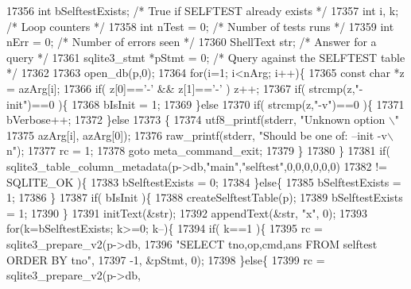 \begin{DoxyCode}
{{{{{{{{{{{{{{{{{{{{{{{{{{{{{{{{{{{{{{{{{{{{{{{{{{{{{{{{{{{{{{{{{{{{{{{{{{{{{{{{{{{{{{{{{{{{{{{{{{{17356     \textcolor{keywordtype}{int} bSelftestExists;     \textcolor{comment}{/* True if SELFTEST already exists */}
17357     \textcolor{keywordtype}{int} i, k;                \textcolor{comment}{/* Loop counters */}
17358     \textcolor{keywordtype}{int} nTest = 0;           \textcolor{comment}{/* Number of tests runs */}
17359     \textcolor{keywordtype}{int} nErr = 0;            \textcolor{comment}{/* Number of errors seen */}
17360     ShellText str;           \textcolor{comment}{/* Answer for a query */}
17361     sqlite3_stmt *pStmt = 0; \textcolor{comment}{/* Query against the SELFTEST table */}
17362 
17363     open_db(p,0);
17364     \textcolor{keywordflow}{for}(i=1; i<nArg; i++)\{
17365       \textcolor{keyword}{const} \textcolor{keywordtype}{char} *z = azArg[i];
17366       \textcolor{keywordflow}{if}( z[0]==\textcolor{charliteral}{'-'} && z[1]==\textcolor{charliteral}{'-'} ) z++;
17367       \textcolor{keywordflow}{if}( strcmp(z,\textcolor{stringliteral}{"-init"})==0 )\{
17368         bIsInit = 1;
17369       \}\textcolor{keywordflow}{else}
17370       \textcolor{keywordflow}{if}( strcmp(z,\textcolor{stringliteral}{"-v"})==0 )\{
17371         bVerbose++;
17372       \}\textcolor{keywordflow}{else}
17373       \{
17374         utf8_printf(stderr, \textcolor{stringliteral}{"Unknown option \(\backslash\)"%
17375                     azArg[i], azArg[0]);
17376         raw_printf(stderr, \textcolor{stringliteral}{"Should be one of: --init -v\(\backslash\)n"});
17377         rc = 1;
17378         \textcolor{keywordflow}{goto} meta\_command\_exit;
17379       \}
17380     \}
17381     \textcolor{keywordflow}{if}( sqlite3_table_column_metadata(p->db,\textcolor{stringliteral}{"main"},\textcolor{stringliteral}{"selftest"},0,0,0,0,0,0)
17382            != SQLITE_OK )\{
17383       bSelftestExists = 0;
17384     \}\textcolor{keywordflow}{else}\{
17385       bSelftestExists = 1;
17386     \}
17387     \textcolor{keywordflow}{if}( bIsInit )\{
17388       createSelftestTable(p);
17389       bSelftestExists = 1;
17390     \}
17391     initText(&str);
17392     appendText(&str, \textcolor{stringliteral}{"x"}, 0);
17393     \textcolor{keywordflow}{for}(k=bSelftestExists; k>=0; k--)\{
17394       \textcolor{keywordflow}{if}( k==1 )\{
17395         rc = sqlite3_prepare_v2(p->db,
17396             \textcolor{stringliteral}{"SELECT tno,op,cmd,ans FROM selftest ORDER BY tno"},
17397             -1, &pStmt, 0);
17398       \}\textcolor{keywordflow}{else}\{
17399         rc = sqlite3_prepare_v2(p->db,
}}}}}}}}}}}}}}}}}}}}}}}}}}}}}}}}}}}}}}}}}}}}}}}}}}}}}}}}}}}}}}}}}}}}}}}}}}}}}}}}}}}}}}}}}}}}}}}}}}}}
\end{DoxyCode}
